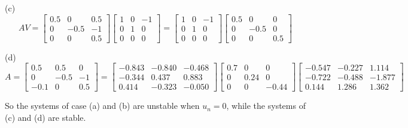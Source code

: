 \quad (c)
\[
    A V =
        \begin{bmatrix}
            0.5 & 0    & 0.5  \\
            0   & -0.5 & -1 \\
            0   & 0    & 0.5
        \end{bmatrix}
        \begin{bmatrix}
            1 & 0 & -1 \\
            0 & 1 & 0 \\
            0 & 0 & 0
        \end{bmatrix}
    =
        \begin{bmatrix}
            1 & 0 & -1 \\
            0 & 1 & 0 \\
            0 & 0 & 0
        \end{bmatrix}
        \begin{bmatrix}
            0.5 & 0    & 0 \\
            0   & -0.5 & 0 \\
            0   & 0    & 0.5
        \end{bmatrix}
\]

\quad (d)
\[
    A =
        \begin{bmatrix}
            0.5  & 0.5   & 0   \\
            0    & -0.5  & -1  \\
            -0.1 & 0     & 0.5
        \end{bmatrix}
    =
        \begin{bmatrix}
            -0.843 & -0.840 & -0.468 \\
            -0.344 &  0.437 & 0.883  \\
            0.414  & -0.323 & -0.050
        \end{bmatrix}
        \begin{bmatrix}
            0.7 & 0      &  0 \\
            0      & 0.24 &  0 \\
            0      & 0     &  -0.44
        \end{bmatrix}
        \begin{bmatrix}
            -0.547 & -0.227 &  1.114 \\
            -0.722 & -0.488 & -1.877\\
            0.144  & 1.286  & 1.362
        \end{bmatrix}
\]

So the systems of case (a) and (b) are unstable when \( u_n = 0 \), while the systems of (c) and (d) are stable.

